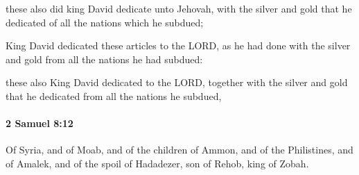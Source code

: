 			\begin{versebox}
					\item[BHS] 
					\item[ASV] these also did king David dedicate unto Jehovah, with the silver and gold that he dedicated of all the nations which he subdued;
					\item[NIV] King David dedicated these articles to the LORD, as he had done with the silver and gold from all the nations he had subdued:
					\item[NRSV] these also King David dedicated to the LORD, together with the silver and gold that he dedicated from all the nations he subdued,
			\end{versebox}

		\paragraph{2 Samuel 8:12} %
			\label{2SAMUEL-8-12}

			Of Syria, and of Moab, and of the children of Ammon, and of the Philistines, and of Amalek, and of the spoil of Hadadezer, son of Rehob, king of Zobah.

